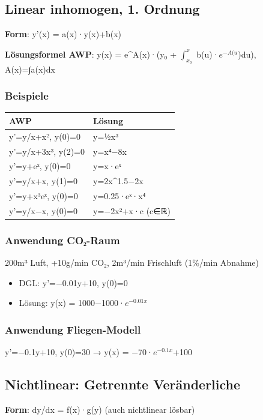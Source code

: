 \documentclass[11pt, a4paper]{article}
\begin{document}
\subsection{Linear inhomogen, 1. Ordnung}
\textbf{Form}: y'(x) = a(x)·y(x)+b(x)

\textbf{Lösungsformel AWP}: y(x) = e\textasciicircum{}A(x)·(y₀ + $\int_{x₀}^{x}$ b(u)·$e^{−A(u}$)du), A(x)=∫a(x)dx



\subsubsection{Beispiele}

{\small
\begin{tabularx}{\linewidth}{XX}
\hline
\rowcolor{tableheadbg}
{\color{white}\textbf{AWP}} & {\color{white}\textbf{Lösung}} \\[2pt]
\hline
\endhead
\hline
\endfoot
y'=y/x+x², y(0)=0 & y=½x³ \\
y'=y/x+3x³, y(2)=0 & y=x⁴−8x \\
y'=y+eˣ, y(0)=0 & y=x·eˣ \\
y'=y/x+x, y(1)=0 & y=2x\textasciicircum{}1.5−2x \\
y'=y+x³eˣ, y(0)=0 & y=0.25·eˣ·x⁴ \\
y'=y/x−x, y(0)=0 & y=−2x²+x·c (c∈ℝ) \\
\end{tabularx}
}



\subsubsection{Anwendung CO₂-Raum}
200m³ Luft, +10g/min CO₂, 2m³/min Frischluft (1\%/min Abnahme)

\begin{itemize}
  \item DGL: y'=−0.01y+10, y(0)=0
  \item Lösung: y(x) = 1000−1000·$e^{−0.01x}$
\end{itemize}


\subsubsection{Anwendung Fliegen-Modell}
y'=−0.1y+10, y(0)=30 → y(x) = −70·$e^{−0.1x}$+100



\subsection{Nichtlinear: Getrennte Veränderliche}
\textbf{Form}: dy/dx = f(x)·g(y) (auch nichtlinear lösbar)
\end{document}
